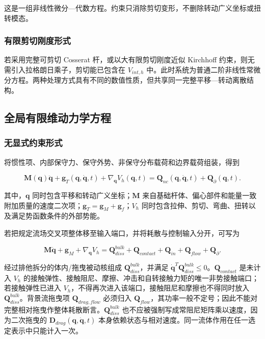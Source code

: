这是一组非线性微分---代数方程。约束只消除剪切变形，不删除转动广义坐标或扭转模态。

\subsubsection{有限剪切刚度形式}\label{sec:galerkin-2-7-3}

若采用完整可剪切 Cosserat 杆，或以大有限剪切刚度近似 Kirchhoff 约束，则无需引入拉格朗日乘子，剪切能已包含在 \(V_{int,h}\) 中。此时系统为普通二阶非线性常微分方程。两种处理方式具有不同的数值性质，但共享同一完整平移---转动离散结构。

\subsection{全局有限维动力学方程}\label{sec:galerkin-2-8}

\subsubsection{无显式约束形式}\label{sec:galerkin-2-8-1}

将惯性项、内部保守力、保守外势、非保守分布载荷和边界载荷组装，得到

\begin{equation}
\label{eq:galerkin-2-97}
\boxed{\mathbf{M}\left( \mathbf{q} \right)\ddot{\mathbf{q}} + \mathbf{g}_{T}\left( \mathbf{q},\dot{\mathbf{q}},t \right) + \nabla_{\mathbf{q}}V_{h}\left( \mathbf{q},t \right) = \mathbf{Q}_{nc}\left( \mathbf{q},\dot{\mathbf{q}},t \right) + \mathbf{Q}_{\partial}\left( \mathbf{q},t \right).}
\end{equation}

其中，\(\mathbf{q}\) 同时包含平移和转动广义坐标；\(\mathbf{M}\) 来自基础杆体、偏心部件和能量一致附加质量的速度二次项；\(\mathbf{g}_{T} = \mathbf{g}_{M} + \mathbf{g}_{f}\)；\(V_{h}\) 同时包含拉伸、剪切、弯曲、扭转以及满足势函数条件的外部势能。

若把规定流场交叉项整体移至输入端口，并将耗散与控制输入分开，可写为

\begin{equation}
\label{eq:galerkin-2-98}
\mathbf{M}\ddot{\mathbf{q}} + \mathbf{g}_{M} + \nabla_{\mathbf{q}}V_{h} = \mathbf{Q}_{diss}^{bulk} + \mathbf{Q}_{contact} + \mathbf{Q}_{in} + \mathbf{Q}_{flow} + \mathbf{Q}_{\partial}.
\end{equation}

经过排他拆分的体内/拖曳被动核组成 \(\mathbf{Q}_{diss}^{bulk}\)，并满足 \({\dot{\mathbf{q}}}^{T}\mathbf{Q}_{diss}^{bulk} \leq 0\)。\(\mathbf{Q}_{contact}\) 是未计入 \(V_h\) 的接触弹性、接触阻尼、摩擦、冲击和自转接触力矩的唯一非势接触端口；若接触弹性已进入 \(V_h\)，不得再次进入该端口，接触阻尼和摩擦也不得同时放入 \(\mathbf{Q}_{diss}^{bulk}\)。背景流拖曳项 \(\mathbf{Q}_{drag,flow}\) 必须归入 \(\mathbf{Q}_{flow}\)，其功率一般不定号；因此不能对完整相对拖曳作整体耗散断言。\(\mathbf{Q}_{diss}^{bulk}\) 也不应被强制写成常阻尼矩阵乘以速度，因为二次拖曳的 \(\mathbf{D}_{drag}\left( \mathbf{q},\dot{\mathbf{q}},t \right)\) 本身依赖状态与相对速度。同一流体作用在任一选定表示中只能计入一次。

